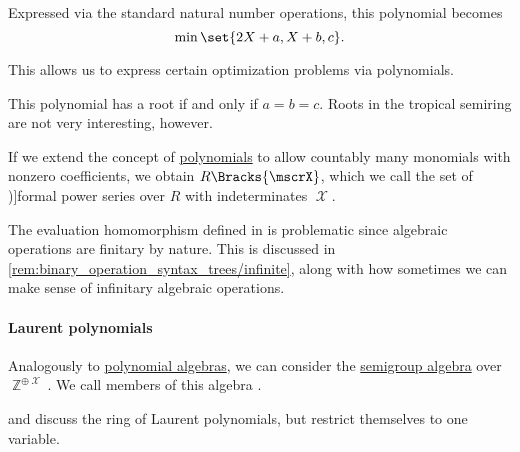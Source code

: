 \begin{example}
\begin{thmenum}
    Expressed via the standard natural number operations, this polynomial becomes
    \begin{equation*}
      \min\set{ 2X + a, X + b, c }.
    \end{equation*}

    This allows us to express certain optimization problems via polynomials.

    This polynomial has a root if and only if \( a = b = c \). Roots in the tropical semiring are not very interesting, however.
  \end{thmenum}
\end{example}

\begin{definition}\label{def:formal_power_series}
  If we extend the concept of \hyperref[def:polynomial_algebra]{polynomials} to allow countably many monomials with nonzero coefficients, we obtain \( R\Bracks{\mscrX} \), which we call the set of \term[ru=формальные степянные ряды (\cite[28]{Шафаревич1999ОсновныеПонятияАлгебры})]{formal power series} over \( R \) with indeterminates \( \mscrX \).
\end{definition}
\begin{comments}
  \item The evaluation homomorphism defined in  is problematic since algebraic operations are finitary by nature. This is discussed in \cref{rem:binary_operation_syntax_trees/infinite}, along with how sometimes we can make sense of infinitary algebraic operations.
\end{comments}

\paragraph{Laurent polynomials}

\begin{definition}\label{def:laurent_polynomial_algebra}\mimprovised
  Analogously to \hyperref[def:polynomial_algebra]{polynomial algebras}, we can consider the \hyperref[def:semigroup_algebra]{semigroup algebra} over \( \BbbZ^{\oplus \mscrX} \). We call members of this algebra .
\end{definition}
\begin{comments}
  \item {} and  discuss the ring of Laurent polynomials, but restrict themselves to one variable.
\end{comments}

